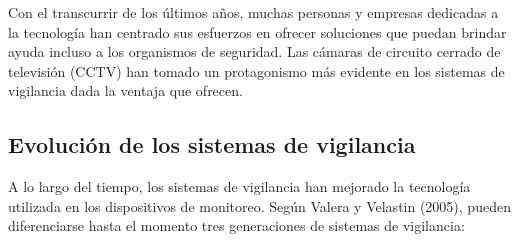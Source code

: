 \documentclass[a4paper,12pt,oneside,spanish]{book}
\begin{document}
Con el transcurrir de los últimos años, muchas personas y empresas dedicadas a la tecnología han centrado sus esfuerzos en ofrecer soluciones que puedan brindar ayuda incluso a los organismos de seguridad. Las cámaras de circuito cerrado de televisión (CCTV) han tomado un protagonismo más evidente en los sistemas de vigilancia dada la ventaja que ofrecen. \par

\subsection{Evolución de los sistemas de vigilancia}
A lo largo del tiempo, los sistemas de vigilancia han mejorado la tecnología utilizada en los dispositivos de monitoreo. Según Valera y  Velastin (2005), pueden diferenciarse hasta el momento tres generaciones de sistemas de vigilancia:
\end{document}
